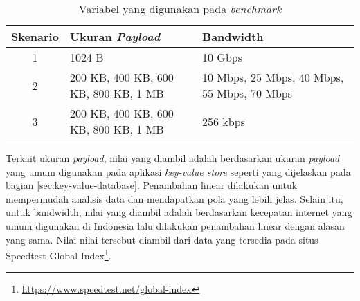 \begin{table}[ht]
  \centering
  \caption{Variabel yang digunakan pada \textit{benchmark}}
  \label{tab:variabel-benchmark}
  \begin{tabular}{|c|p{6cm}|p{6cm}|}
    \hline
    \textbf{Skenario} & \textbf{Ukuran \textit{Payload}} & \textbf{Bandwidth} \\ \hline
    1 & 1024 B & 10 Gbps \\ \hline
    2 & 200 KB, 400 KB, 600 KB, 800 KB, 1 MB & 10 Mbps, 25 Mbps, 40 Mbps, 55 Mbps, 70 Mbps \\ \hline
    3 & 200 KB, 400 KB, 600 KB, 800 KB, 1 MB & 256 kbps \\ \hline
  \end{tabular}
\end{table}

Terkait ukuran \textit{payload}, nilai yang diambil adalah berdasarkan ukuran \textit{payload} yang umum digunakan pada aplikasi \textit{key-value store} seperti yang dijelaskan pada bagian \ref{sec:key-value-database}. Penambahan linear dilakukan untuk mempermudah analisis data dan mendapatkan pola yang lebih jelas. Selain itu, untuk bandwidth, nilai yang diambil adalah berdasarkan kecepatan internet yang umum digunakan di Indonesia lalu dilakukan penambahan linear dengan alasan yang sama. Nilai-nilai tersebut diambil dari data yang tersedia pada situs Speedtest Global Index\footnote{\url{https://www.speedtest.net/global-index}}.
